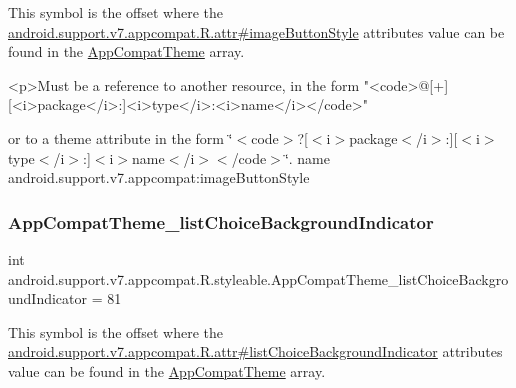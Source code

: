 This symbol is the offset where the \hyperlink{classandroid_1_1support_1_1v7_1_1appcompat_1_1R_1_1attr_aaf6e8d174819edbd2057100e1d00b6e7}{android.\+support.\+v7.\+appcompat.\+R.\+attr\#image\+Button\+Style} attribute\textquotesingle{}s value can be found in the \hyperlink{classandroid_1_1support_1_1v7_1_1appcompat_1_1R_1_1styleable_a5c42f89e8a410c323be34208d75c430b}{App\+Compat\+Theme} array.

\begin{DoxyVerb}      <p>Must be a reference to another resource, in the form "<code>@[+][<i>package</i>:]<i>type</i>:<i>name</i></code>"
\end{DoxyVerb}
 or to a theme attribute in the form \char`\"{}$<$code$>$?\mbox{[}$<$i$>$package$<$/i$>$\+:\mbox{]}\mbox{[}$<$i$>$type$<$/i$>$\+:\mbox{]}$<$i$>$name$<$/i$>$$<$/code$>$\char`\"{}.  name android.\+support.\+v7.\+appcompat\+:image\+Button\+Style \mbox{\label{classandroid_1_1support_1_1v7_1_1appcompat_1_1R_1_1styleable_a099705a7173bf4f42f97f179e7b70d69}} 
\subsubsection{\texorpdfstring{App\+Compat\+Theme\+\_\+list\+Choice\+Background\+Indicator}{AppCompatTheme\_listChoiceBackgroundIndicator}}
{\footnotesize\ttfamily int android.\+support.\+v7.\+appcompat.\+R.\+styleable.\+App\+Compat\+Theme\+\_\+list\+Choice\+Background\+Indicator = 81\hspace{0.3cm}{\ttfamily [static]}}

This symbol is the offset where the \hyperlink{classandroid_1_1support_1_1v7_1_1appcompat_1_1R_1_1attr_a8478bb010748f1d9c25576387050c212}{android.\+support.\+v7.\+appcompat.\+R.\+attr\#list\+Choice\+Background\+Indicator} attribute\textquotesingle{}s value can be found in the \hyperlink{classandroid_1_1support_1_1v7_1_1appcompat_1_1R_1_1styleable_a5c42f89e8a410c323be34208d75c430b}{App\+Compat\+Theme} array.

